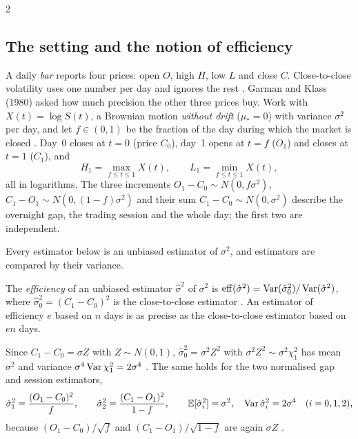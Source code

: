\begin{paracol}{2}
\subsection{The setting and the notion of efficiency}\label{ch13:sec-eff}
A daily \emph{bar} reports four prices: open $O$, high $H$, low $L$ and close $C$. Close-to-close volatility uses one number per day and
ignores the rest . Garman and Klass (1980) asked how much precision the other three
prices buy. Work with $X(t)=\log S(t)$, a Brownian motion \emph{without drift} ($\mu_*=0$) with variance $\sigma^2$ per day, and
let $f\in(0,1)$ be the fraction of the day during which the market is closed . Day~0 closes at
$t=0$ (price $C_0$), day~1 opens at $t=f$ ($O_1$) and closes at $t=1$ ($C_1$), and
\[
  H_1=\max_{f\le t\le1}X(t),\qquad L_1=\min_{f\le t\le1}X(t),
\]
all in logarithms. The three increments $O_1-C_0\sim N(0,f\sigma^2)$, $C_1-O_1\sim N(0,(1-f)\sigma^2)$ and their sum
$C_1-C_0\sim N(0,\sigma^2)$ describe the overnight gap, the trading session and the whole day; the first two are independent.

Every estimator below is an unbiased estimator of $\sigma^2$, and estimators are compared by their variance.

\begin{definition}[Efficiency]\label{ch13:def-eff}
The \emph{efficiency} of an unbiased estimator $\hat\sigma^2$ of $\sigma^2$ is $\mathrm{eff}(\hat\sigma^2)=\operatorname{Var}(\hat\sigma^2_0)/\operatorname{Var}(\hat\sigma^2)$, where
$\hat\sigma_0^2=(C_1-C_0)^2$ is the close-to-close estimator . An estimator of efficiency $e$ based on $n$
days is as precise as the close-to-close estimator based on $en$ days.
\end{definition}
Since $C_1-C_0=\sigma Z$ with $Z\sim N(0,1)$, $\hat\sigma_0^2=\sigma^2Z^2$ with $\sigma^2Z^2\sim\sigma^2\chi^2_1$ has mean $\sigma^2$ and
variance $\sigma^4\operatorname{Var}\chi^2_1=2\sigma^4$ . The same holds for
the two normalised gap and session estimators,
\begin{equation}\label{ch13:eq-gk1}
  \hat\sigma_1^2=\frac{(O_1-C_0)^2}{f},\qquad \hat\sigma_2^2=\frac{(C_1-O_1)^2}{1-f},\qquad
  \mathbb{E}[\hat\sigma_i^2]=\sigma^2,\quad\operatorname{Var}\hat\sigma_i^2=2\sigma^4\quad(i=0,1,2),
\end{equation}
because $(O_1-C_0)/\sqrt f$ and $(C_1-O_1)/\sqrt{1-f}$ are again $\sigma Z$ .


\end{paracol}
